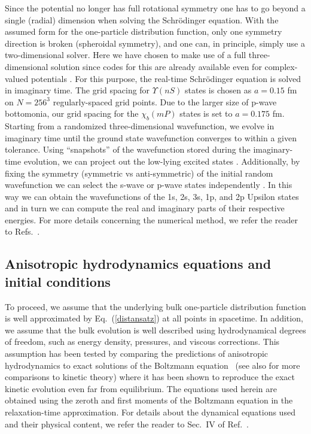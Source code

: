 Since the potential no longer has full rotational symmetry one has to go beyond a single (radial) dimension when solving the Schr\"odinger equation.  With the assumed form for the one-particle distribution function, only one symmetry direction is broken (spheroidal symmetry), and one can, in principle, simply use a two-dimensional solver. Here we have chosen to make use of a full three-dimensional solution since codes for this are already available even for complex-valued potentials \cite{Strickland:2009ft,Margotta:2011ta}.  For this purpose, the real-time Schr\"odinger equation is solved in imaginary time. The grid spacing for $\Upsilon(nS)$ states is chosen as $a=0.15$ fm on $N=256^3$ regularly-spaced grid points. Due to the larger size of p-wave bottomonia, our grid spacing for the $\chi_{b}(mP)$ states is set to $a=0.175$ fm. Starting from a randomized three-dimensional wavefunction, we evolve in imaginary time until the ground state wavefunction converges to within a given tolerance.  Using ``snapshots'' of the wavefunction stored during the imaginary-time evolution, we can project out the low-lying excited states \cite{Strickland:2009ft}.  Additionally, by fixing the symmetry (symmetric vs anti-symmetric) of the initial random wavefunction we can select the s-wave or p-wave states independently \cite{Strickland:2009ft}.  In this way we can obtain the wavefunctions of the 1s, 2s, 3s, 1p, and 2p Upsilon states and in turn we can compute the real and imaginary parts of their respective energies. For more details concerning the numerical method, we refer the reader to Refs.~\cite{Strickland:2009ft,Margotta:2011ta}.


\subsection{Anisotropic hydrodynamics equations and initial conditions}
\label{ssec:3p1}

To proceed, we assume that the underlying bulk one-particle distribution function is well approximated by Eq.~(\ref{distansatz}) at all points in spacetime. In addition, we assume that the bulk evolution is well described using hydrodynamical degrees of freedom, such as energy density, pressures, and viscous corrections.  This assumption has been tested by comparing the predictions of anisotropic hydrodynamics to exact solutions of the Boltzmann equation~\cite{Florkowski:2013lza,Florkowski:2013lya,Bazow:2013ifa,Florkowski:2014sfa,Florkowski:2014sda,Denicol:2014xca,Denicol:2014tha,Nopoush:2014qba,Molnar:2016gwq,Martinez:2017ibh} (see also \cite{Damodaran:2017ior} for more comparisons to kinetic theory) where it has been shown to reproduce the exact kinetic evolution even far from equilibrium.  The equations used herein are obtained using the zeroth and first moments of the Boltzmann equation in the relaxation-time approximation.  For details about the dynamical equations used and their physical content, we refer the reader to Sec.~IV of Ref.~\cite{Ryblewski:2015hea}.

